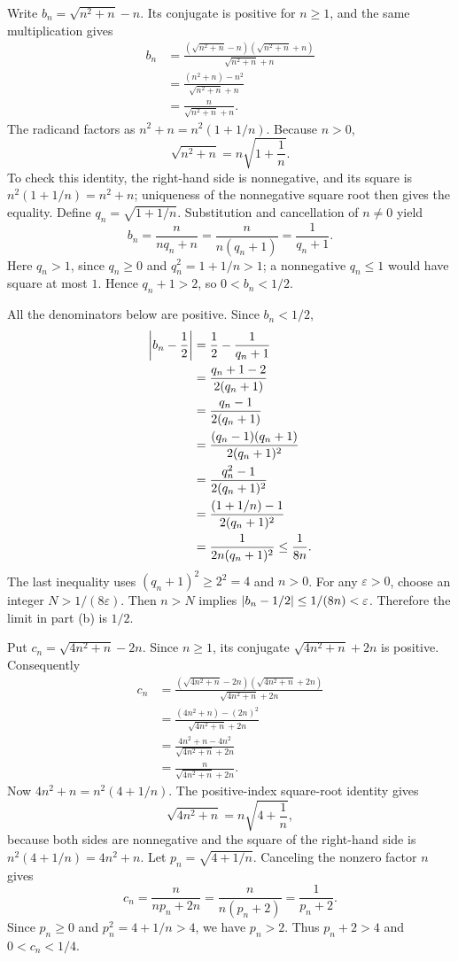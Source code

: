 Write $b_n=\sqrt{n^2+n}-n$. Its conjugate is positive for
$n\ge1$, and the same multiplication gives
\begin{align*}
 b_n
 &=\frac{(\sqrt{n^2+n}-n)(\sqrt{n^2+n}+n)}
         {\sqrt{n^2+n}+n}\\
 &=\frac{(n^2+n)-n^2}{\sqrt{n^2+n}+n}\\
 &=\frac n{\sqrt{n^2+n}+n}.
\end{align*}
The radicand factors as $n^2+n=n^2(1+1/n)$. Because $n>0$,
\[
 \sqrt{n^2+n}=n\sqrt{1+\frac1n}.
\]
To check this identity, the right-hand side is nonnegative, and
its square is $n^2(1+1/n)=n^2+n$; uniqueness of the nonnegative
square root then gives the equality. Define
$q_n=\sqrt{1+1/n}$. Substitution and cancellation of $n\ne0$ yield
\[
 b_n=\frac n{nq_n+n}
     =\frac n{n(q_n+1)}
     =\frac1{q_n+1}.
\]
Here $q_n>1$, since $q_n\ge0$ and
$q_n^2=1+1/n>1$; a nonnegative $q_n\le1$ would have square
at most $1$. Hence $q_n+1>2$, so $0<b_n<1/2$.

All the denominators below are positive. Since $b_n<1/2$,
\begin{align*}
 \left|b_n-\frac12\right|
 &=\frac12-\frac1{q_n+1}\\
 &=\frac{q_n+1-2}{2(q_n+1)}\\
 &=\frac{q_n-1}{2(q_n+1)}\\
 &=\frac{(q_n-1)(q_n+1)}{2(q_n+1)^2}\\
 &=\frac{q_n^2-1}{2(q_n+1)^2}\\
 &=\frac{(1+1/n)-1}{2(q_n+1)^2}\\
 &=\frac1{2n(q_n+1)^2}
 \le\frac1{8n}.
\end{align*}
The last inequality uses $(q_n+1)^2\ge2^2=4$ and $n>0$.
For any $\varepsilon>0$, choose an integer $N>1/(8\varepsilon)$.
Then $n>N$ implies
$\left|b_n-1/2\right|\le1/(8n)<\varepsilon$.
Therefore the limit in part \textup{(b)} is $1/2$.

Put $c_n=\sqrt{4n^2+n}-2n$. Since $n\ge1$, its conjugate
$\sqrt{4n^2+n}+2n$ is positive. Consequently
\begin{align*}
 c_n
 &=\frac{(\sqrt{4n^2+n}-2n)(\sqrt{4n^2+n}+2n)}
         {\sqrt{4n^2+n}+2n}\\
 &=\frac{(4n^2+n)-(2n)^2}{\sqrt{4n^2+n}+2n}\\
 &=\frac{4n^2+n-4n^2}{\sqrt{4n^2+n}+2n}\\
 &=\frac n{\sqrt{4n^2+n}+2n}.
\end{align*}
Now $4n^2+n=n^2(4+1/n)$. The positive-index square-root
identity gives
\[
 \sqrt{4n^2+n}=n\sqrt{4+\frac1n},
\]
because both sides are nonnegative and the square of the right-hand
side is $n^2(4+1/n)=4n^2+n$. Let
$p_n=\sqrt{4+1/n}$. Canceling the nonzero factor $n$ gives
\[
 c_n=\frac n{np_n+2n}
     =\frac n{n(p_n+2)}
     =\frac1{p_n+2}.
\]
Since $p_n\ge0$ and $p_n^2=4+1/n>4$, we have $p_n>2$.
Thus $p_n+2>4$ and $0<c_n<1/4$.

